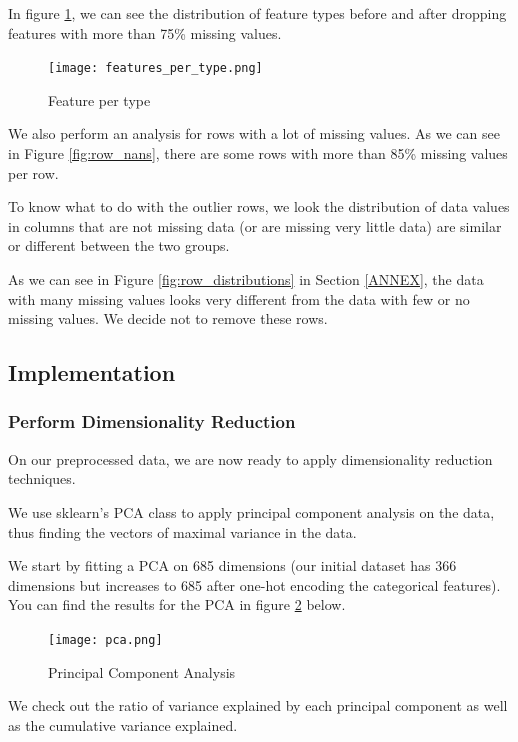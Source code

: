 In figure \ref{fig:features_per_type}, we can see the distribution of feature types before and after dropping features with more than 75\% missing values.

\begin{figure}[h]
\centering
\texttt{[image: features\_per\_type.png]}
\caption{Feature per type}
\label{fig:features_per_type}
\end{figure}

We also perform an analysis for rows with a lot of missing values. As we can see in Figure \ref{fig:row_nans}, there are some rows with more than 85\% missing values per row.

To know what to do with the outlier rows, we look the distribution of data values in columns that are not missing data (or are missing very little data) are similar or different between the two groups.

 As we can see in Figure \ref{fig:row_distributions} in Section \ref{ANNEX}, the data with many missing values looks very different from the data with few or no missing values. We decide not to remove these rows.

\subsection{Implementation}

\subsubsection{Perform Dimensionality Reduction}

On our preprocessed data, we are now ready to apply dimensionality reduction techniques.

We use sklearn's PCA class to apply principal component analysis on the data, thus finding the vectors of maximal variance in the data. 

We start by fitting a PCA on 685 dimensions (our initial dataset has 366 dimensions but increases to 685 after one-hot encoding the categorical features). You can find the results for the PCA in figure \ref{fig:pca} below.

\begin{figure}[h]
\centering
\texttt{[image: pca.png]}
\caption{Principal Component Analysis}
\label{fig:pca}
\end{figure}

We check out the ratio of variance explained by each principal component as well as the cumulative variance explained. 

